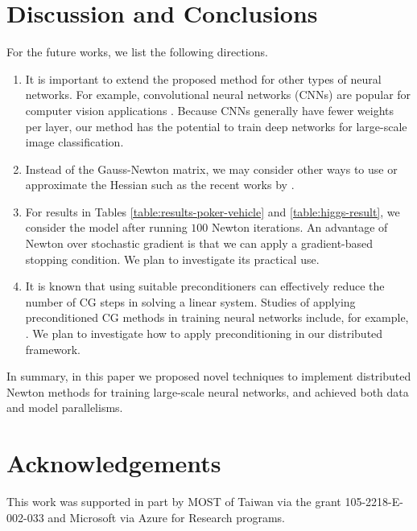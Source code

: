\documentclass[12pt]{article}
\begin{document}
\section{Discussion and Conclusions}
\label{sec:conclu}
 For the future works, we list the following directions.
\begin{enumerate}[1.]
\item
It is important to extend the proposed method for other types of neural networks. For example, convolutional neural networks (CNNs) are 
popular for computer vision applications \citep[e.g., ][]{AK12b, KS14a}.
Because CNNs generally have fewer weights per layer, our method has the potential to train deep networks for large-scale image classification.
\item
Instead of the Gauss-Newton matrix,
we may consider other ways to use or approximate the Hessian such as the recent works by \cite{XH16a}.
\item
For results in Tables \ref{table:results-poker-vehicle} and \ref{table:higgs-result}, we consider the model after running $100$ Newton iterations. An advantage of Newton over stochastic gradient
is that we can apply a gradient-based stopping condition. We plan to investigate its practical use.
\item
It is known that using suitable preconditioners can effectively reduce the number of CG steps in solving a linear system.
Studies of applying preconditioned CG methods in training neural networks include, for example, \cite{OC11b}. We plan to investigate how to apply
preconditioning in our distributed framework.
\end{enumerate}
\par In summary, in this paper we proposed novel techniques to implement distributed Newton methods for training large-scale neural networks, and achieved
both data and model parallelisms.
\section*{Acknowledgements}
This work was supported in part by MOST of Taiwan via the grant 105-2218-E-002-033
and Microsoft via Azure for Research programs.


\end{document}
